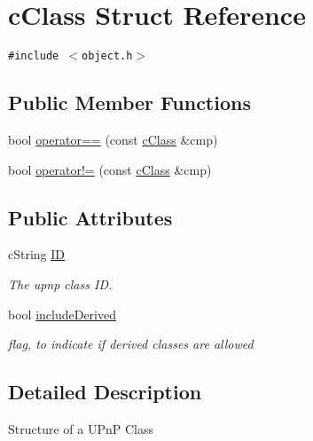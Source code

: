 \hypertarget{structcClass}{
\section{cClass Struct Reference}
\label{structcClass}
}
{\tt \#include $<$object.h$>$}

\subsection*{Public Member Functions}
\begin{CompactItemize}
\item 
bool \hyperlink{structcClass_22a5df5fd2bfc9e7b58018a6b8d45309}{operator==} (const \hyperlink{structcClass}{cClass} \&cmp)
\item 
bool \hyperlink{structcClass_1de09f337ef261d363f261f83a3cf7ae}{operator!=} (const \hyperlink{structcClass}{cClass} \&cmp)
\end{CompactItemize}
\subsection*{Public Attributes}
\begin{CompactItemize}
\item 
\hypertarget{structcClass_0a14fb51e02dc017227b86e3c14b5cbd}{
cString \hyperlink{structcClass_0a14fb51e02dc017227b86e3c14b5cbd}{ID}}
\label{structcClass_0a14fb51e02dc017227b86e3c14b5cbd}

\begin{CompactList}\small\item\em The upnp class ID. \item\end{CompactList}\item 
\hypertarget{structcClass_4c66f7ea7dc7bfd418ae8c23145ea3c8}{
bool \hyperlink{structcClass_4c66f7ea7dc7bfd418ae8c23145ea3c8}{includeDerived}}
\label{structcClass_4c66f7ea7dc7bfd418ae8c23145ea3c8}

\begin{CompactList}\small\item\em flag, to indicate if derived classes are allowed \item\end{CompactList}\end{CompactItemize}


\subsection{Detailed Description}
Structure of a UPnP Class

